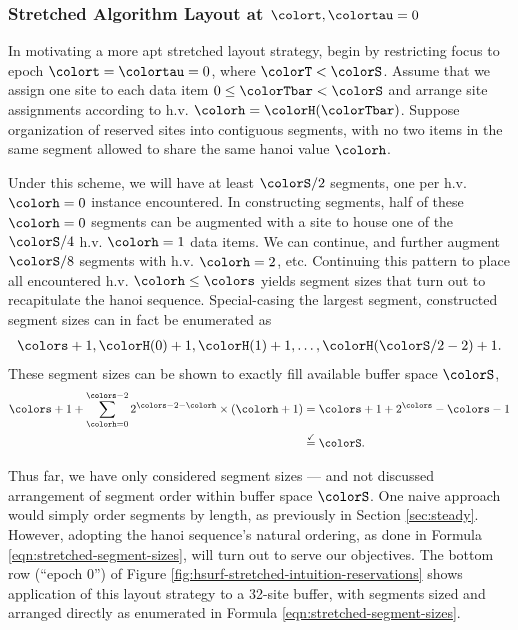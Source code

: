 \subsubsection{Stretched Algorithm Layout at $\colort,\colortau=0$}

In motivating a more apt stretched layout strategy, begin by restricting focus to epoch $\colort=\colortau=0$, where $\colorT < \colorS$.
Assume that we assign one site to each data item $0\leq \colorTbar < \colorS$ and arrange site assignments according to h.v. $\colorh = \colorH(\colorTbar)$.
Suppose organization of reserved sites into contiguous segments, with no two items in the same segment allowed to share the same hanoi value $\colorh$.

Under this scheme, we will have at least $\colorS/2$ segments, one per h.v. $\colorh=0$ instance encountered.
In constructing segments, half of these $\colorh=0$ segments can be augmented with a site to house one of the $\colorS/4$ h.v. $\colorh=1$ data items.
We can continue, and further augment $\colorS/8$ segments with h.v. $\colorh=2$, etc.
Continuing this pattern to place all encountered h.v. $\colorh\leq\colors$ yields segment sizes that turn out to recapitulate the hanoi sequence.
Special-casing the largest segment, constructed segment sizes can in fact be enumerated as
\begin{align}
\colors + 1, \colorH(0) + 1, \colorH(1) + 1, \ldots, \colorH(\colorS/2 - 2) + 1.
\label{eqn:stretched-segment-sizes}
\end{align}
These segment sizes can be shown to exactly fill available buffer space $\colorS$,
\begin{align*}
\colors + 1
+  \sum_{\colorh = 0}^{\colors - 2}
2^{\colors - 2 - \colorh} \times (\colorh + 1)
&=
\colors + 1 +
2^{\colors} - \colors - 1\\
&\stackrel{\checkmark}{=}
\colorS.
\end{align*}

Thus far, we have only considered segment sizes --- and not discussed arrangement of segment order within buffer space $\colorS$.
One naive approach would simply order segments by length, as previously in Section \ref{sec:steady}.
However, adopting the hanoi sequence's natural ordering, as done in Formula \ref{eqn:stretched-segment-sizes}, will turn out to serve our objectives.
The bottom row (``epoch 0'') of Figure \ref{fig:hsurf-stretched-intuition-reservations} shows application of this layout strategy to a 32-site buffer, with segments sized and arranged directly as enumerated in Formula \ref{eqn:stretched-segment-sizes}.

